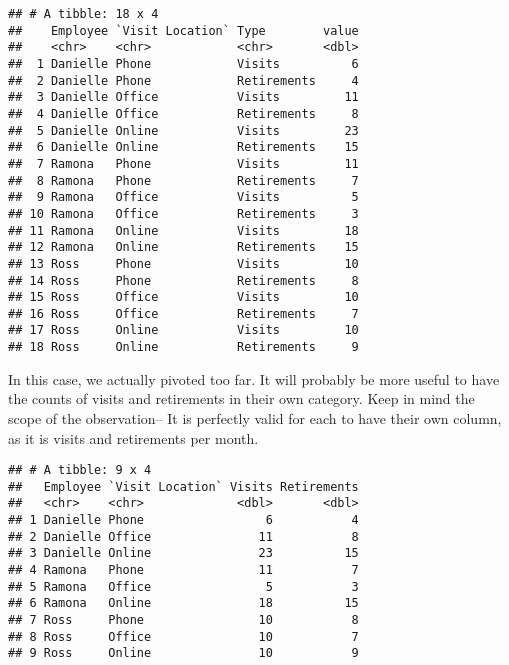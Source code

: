 \documentclass[]{book}
\newenvironment{Shaded}{\begin{snugshade}}{\end{snugshade}}
\newcommand{\KeywordTok}[1]{\textcolor[rgb]{0.13,0.29,0.53}{\textbf{#1}}}
\newcommand{\DataTypeTok}[1]{\textcolor[rgb]{0.13,0.29,0.53}{#1}}
\newcommand{\StringTok}[1]{\textcolor[rgb]{0.31,0.60,0.02}{#1}}
\newcommand{\OperatorTok}[1]{\textcolor[rgb]{0.81,0.36,0.00}{\textbf{#1}}}
\newcommand{\NormalTok}[1]{#1}
\begin{document}
\begin{verbatim}
## # A tibble: 18 x 4
##    Employee `Visit Location` Type        value
##    <chr>    <chr>            <chr>       <dbl>
##  1 Danielle Phone            Visits          6
##  2 Danielle Phone            Retirements     4
##  3 Danielle Office           Visits         11
##  4 Danielle Office           Retirements     8
##  5 Danielle Online           Visits         23
##  6 Danielle Online           Retirements    15
##  7 Ramona   Phone            Visits         11
##  8 Ramona   Phone            Retirements     7
##  9 Ramona   Office           Visits          5
## 10 Ramona   Office           Retirements     3
## 11 Ramona   Online           Visits         18
## 12 Ramona   Online           Retirements    15
## 13 Ross     Phone            Visits         10
## 14 Ross     Phone            Retirements     8
## 15 Ross     Office           Visits         10
## 16 Ross     Office           Retirements     7
## 17 Ross     Online           Visits         10
## 18 Ross     Online           Retirements     9
\end{verbatim}

In this case, we actually pivoted too far. It will probably be more
useful to have the counts of visits and retirements in their own
category. Keep in mind the scope of the observation-- It is perfectly
valid for each to have their own column, as it is visits and retirements
per month.

\begin{Shaded}
\end{Shaded}

\begin{verbatim}
## # A tibble: 9 x 4
##   Employee `Visit Location` Visits Retirements
##   <chr>    <chr>             <dbl>       <dbl>
## 1 Danielle Phone                 6           4
## 2 Danielle Office               11           8
## 3 Danielle Online               23          15
## 4 Ramona   Phone                11           7
## 5 Ramona   Office                5           3
## 6 Ramona   Online               18          15
## 7 Ross     Phone                10           8
## 8 Ross     Office               10           7
## 9 Ross     Online               10           9
\end{verbatim}
\end{document}
